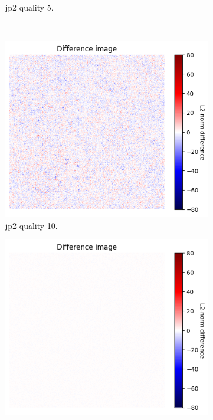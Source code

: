 \begin{figure}[htb]
\begin{subfigure}[b]{0.49\textwidth}
            \caption{\gls{jp2} quality 5.}
            \label{fig:img_quality_center_heatmap_5}
        \end{subfigure}
        \\
        \begin{subfigure}[b]{0.49\textwidth}
            \centering
            \includegraphics[width=\textwidth]{doc/thesis/0_figures/compare_quality/set1/heatmap/jp2_10_center_diff_heatmap.png}
            \caption{\gls{jp2} quality 10.}
            \label{fig:img_quality_center_heatmap_10}
        \end{subfigure}
        \begin{subfigure}[b]{0.49\textwidth}
            \centering
            \includegraphics[width=\textwidth]{doc/thesis/0_figures/compare_quality/set1/heatmap/jp2_100_center_diff_heatmap.png}

\end{subfigure}
\end{figure}
